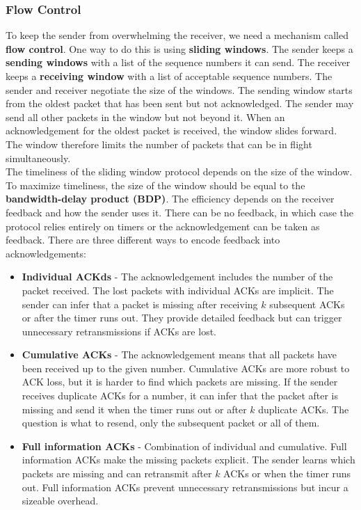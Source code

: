 \subsubsection{Flow Control}
To keep the sender from overwhelming the receiver, we need a mechanism called 
\textbf{flow control}. One way to do this is using \textbf{sliding windows}. The sender keeps a \textbf{sending windows} with a list of the sequence numbers it can send. The receiver keeps a \textbf{receiving window} with a list of acceptable sequence numbers. The sender and receiver negotiate the size of the windows. The sending window starts from the oldest packet that has been sent but not acknowledged. The sender may send all other packets in the window but not beyond it. When an acknowledgement for the oldest packet is received, the window slides forward. The window therefore limits the number of packets that can be in flight simultaneously. \\
The timeliness of the sliding window protocol depends on the size of the window. To maximize timeliness, the size of the window should be equal to the \textbf{bandwidth-delay product (BDP)}. The efficiency depends on the receiver feedback and how the sender uses it. There can be no feedback, in which case the protocol relies entirely on timers or the acknowledgement can be taken as feedback. There are three different ways to encode feedback into acknowledgements:
\begin{itemize}
\item \textbf{Individual ACKds} - The acknowledgement includes the number of the packet received. The lost packets with individual ACKs are implicit. The sender can infer that a packet is missing after receiving $k$ subsequent ACKs or after the timer runs out. They provide detailed feedback but can trigger unnecessary retransmissions if ACKs are lost.
\item \textbf{Cumulative ACKs} - The acknowledgement means that all packets have been received up to the given number. Cumulative ACKs are more robust to ACK loss, but it is harder to find which packets are missing. If the sender receives duplicate ACKs for a number, it can infer that the packet after is missing and send it when the timer runs out or after $k$ duplicate ACKs. The question is what to resend, only the subsequent packet or all of them. 
\item \textbf{Full information ACKs} - Combination of individual and cumulative. Full information ACKs make the missing packets explicit. The sender learns which packets are missing and can retransmit after $k$ ACKs or when the timer runs out. Full information ACKs prevent unnecessary retransmissions but incur a sizeable overhead.
\end{itemize}
